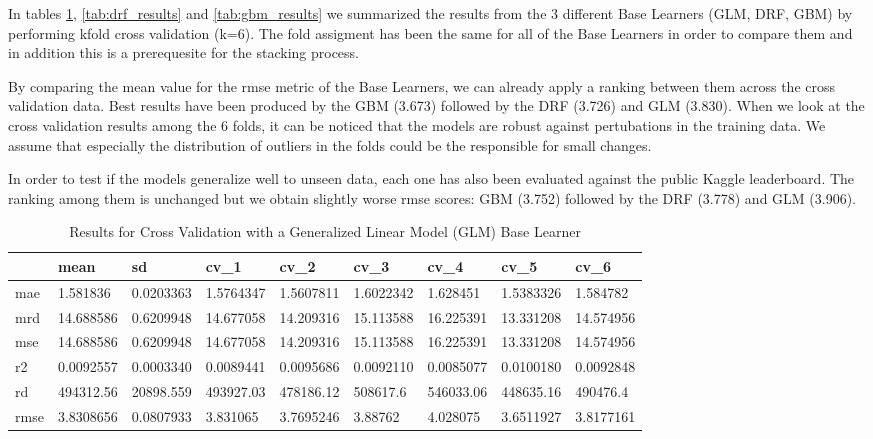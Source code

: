 \documentclass{article}
\begin{document}

In tables \ref{tab:glm_results}, \ref{tab:drf_results} and \ref{tab:gbm_results} we summarized the results from the 3 different Base Learners (GLM, DRF, GBM) by performing kfold cross validation (k=6). The fold assigment has been the same for all of the Base Learners in order to compare them and in addition this is a prerequesite for the stacking process.

By comparing the mean value for the rmse metric of the Base Learners, we can already apply a ranking between them across the cross validation data. Best results have been produced by the GBM (3.673) followed by the DRF (3.726) and GLM (3.830). When we look at the cross validation results among the 6 folds, it can be noticed that the models are robust against pertubations in the training data. We assume that especially the distribution of outliers in the folds could be the responsible for small changes. 

In order to test if the models generalize well to unseen data, each one has also been evaluated against the public Kaggle leaderboard. The ranking among them is unchanged but we obtain slightly worse rmse scores: GBM (3.752) followed by the DRF (3.778) and GLM (3.906).


\begin{table}[h]
 \caption{Results for Cross Validation with a Generalized Linear Model (GLM) Base Learner}
  \centering
  \begin{tabular}{lllllllll}
    \toprule
     &          mean & sd & cv\_1 & cv\_2 & cv\_3 & cv\_4 & cv\_5 & cv\_6\\
    \midrule
    mae&        1.581836&0.0203363&1.5764347&1.5607811&1.6022342&1.628451&1.5383326&1.584782\\
    mrd&        14.688586&0.6209948&14.677058&14.209316&15.113588&16.225391&13.331208&14.574956\\
    mse&        14.688586&0.6209948&14.677058&14.209316&15.113588&16.225391&13.331208&14.574956\\
    r2&         0.0092557&0.0003340&0.0089441&0.0095686&0.0092110&0.0085077&0.0100180&0.0092848\\
    rd&         494312.56&20898.559&493927.03&478186.12&508617.6&546033.06&448635.16&490476.4\\
    rmse&       3.8308656&0.0807933&3.831065&3.7695246&3.88762&4.028075&3.6511927&3.8177161\\
    \bottomrule
  \end{tabular}
  \label{tab:glm_results}
\end{table}
\end{document}
